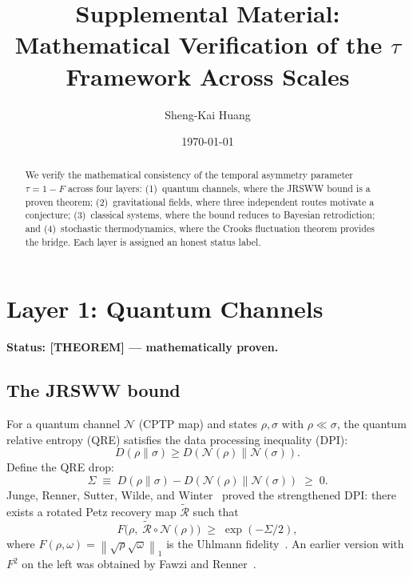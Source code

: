 \documentclass[prl,twocolumn,superscriptaddress,longbibliography,floatfix]{revtex4-2}
\newcommand{\Petz}{\mathcal{R}}
\newcommand{\chan}{\mathcal{N}}
\newcommand{\norm}[1]{\left\|#1\right\|}
\newcommand{\tauasym}{\tau}
\begin{document}
\title{Supplemental Material: Mathematical Verification of the
$\tauasym$ Framework Across Scales}

\author{Sheng-Kai Huang}

\date{\today}

\begin{abstract}
We verify the mathematical consistency of the temporal asymmetry
parameter $\tauasym = 1-F$ across four layers:
(1)~quantum channels, where the JRSWW bound is a proven theorem;
(2)~gravitational fields, where three independent routes motivate
a conjecture;
(3)~classical systems, where the bound reduces to Bayesian
retrodiction; and
(4)~stochastic thermodynamics, where the Crooks fluctuation theorem
provides the bridge.
Each layer is assigned an honest status label.
\end{abstract}

\maketitle

\section{Layer 1: Quantum Channels}
\label{sec:layer1}

\noindent\textbf{Status: [THEOREM] --- mathematically proven.}

\subsection{The JRSWW bound}

For a quantum channel $\chan$ (CPTP map) and states $\rho, \sigma$
with $\rho \ll \sigma$, the quantum relative entropy (QRE)
satisfies the data processing inequality (DPI):
\begin{equation}
D(\rho\|\sigma) \geq D(\chan(\rho)\|\chan(\sigma)).
\label{eq:DPI}
\end{equation}
Define the QRE drop:
\begin{equation}
\Sigma \;\equiv\; D(\rho\|\sigma) - D(\chan(\rho)\|\chan(\sigma))
\;\geq\; 0.
\label{eq:Sigma_def}
\end{equation}
Junge, Renner, Sutter, Wilde, and Winter~\cite{JRSWW2018}
proved the strengthened DPI: there exists a rotated Petz recovery
map $\tilde{\Petz}$ such that
\begin{equation}
F\bigl(\rho,\;\tilde{\Petz}\circ\chan(\rho)\bigr)
\;\geq\; \exp(-\Sigma/2),
\label{eq:JRSWW}
\end{equation}
where $F(\rho,\omega) = \norm{\sqrt{\rho}\sqrt{\omega}}_1$ is
the Uhlmann fidelity~\cite{Uhlmann1976}. An earlier version with
$F^2$ on the left was obtained by Fawzi and
Renner~\cite{FawziRenner2015}.
\end{document}
